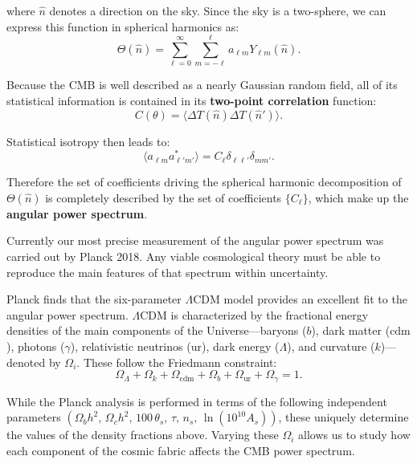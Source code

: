 \documentclass[11pt,a4paper]{article}
\numberwithin{equation}{section}
\begin{document}
where $\hat n$ denotes a direction on the sky. Since the sky is a two-sphere, we can express this function in spherical harmonics as:
\begin{equation}
  \Theta(\hat n) = \sum_{\ell=0}^{\infty} \sum_{m = -\ell}^\ell a_{\ell m}Y_{\ell m}(\hat n).
\end{equation}

Because the CMB is well described as a nearly Gaussian random field, all of its statistical information is contained in its \textbf{two-point correlation} function:
\begin{equation}
  C(\theta) = \langle\Delta T(\hat n)\Delta T(\hat n')\rangle.
\end{equation}

Statistical isotropy then leads to: 
\begin{equation}
  \langle a_{\ell m} a_{\ell' m'}^*\rangle = C_{\ell} \delta_{\ell \ell'} \delta_{mm'}.
\end{equation}

Therefore the set of coefficients driving the spherical harmonic decomposition of $\Theta(\hat n)$ is completely described by the set of coefficients $\{C_\ell\}$, which make up the \textbf{angular power spectrum}. 

Currently our most precise measurement of the angular power spectrum was carried out by Planck 2018. Any viable cosmological theory must be able to reproduce the main features of that spectrum within uncertainty.  


Planck finds that the six-parameter $\Lambda$CDM model provides an excellent fit to the angular power spectrum. $\Lambda$CDM is characterized by the fractional energy densities of the main components of the Universe—baryons ($b$), dark matter ($\text{cdm}$), photons ($\gamma$), relativistic neutrinos ($\text{ur}$), dark energy ($\Lambda$), and curvature ($k$)—denoted by $\Omega_i$. These follow the Friedmann constraint:
\begin{equation}
\Omega_{\Lambda} + \Omega_k + \Omega_\text{cdm} + \Omega_b+ \Omega_\text{ur} + \Omega_\gamma = 1.
\end{equation}

While the Planck analysis is performed in terms of the following independent parameters $(\Omega_b h^2,\, \Omega_c h^2,\, 100\,\theta_s,\, \tau,\, n_s,\, \ln(10^{10}A_s))$,
these uniquely determine the values of the density fractions above. Varying these $\Omega_i$ allows us to study how each component of the cosmic fabric affects the CMB power spectrum. 
\end{document}
